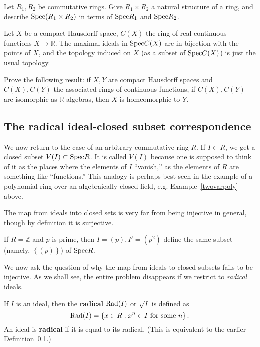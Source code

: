 \begin{exercise} 
Let $R_1, R_2$ be commutative rings. Give $R_1 \times R_2$ a natural structure
of a ring, and describe $\mathrm{Spec}( R_1 \times R_2)$ in terms of $\mathrm{Spec} R_1$ and
$\mathrm{Spec} R_2$.
\end{exercise} 


\begin{exercise} 
Let $X$ be a compact Hausdorff space, $C(X)$ the ring of real continuous
functions $X \to \mathbb{R}$. 
The maximal ideals in $\mathrm{Spec} C(X)$ are in bijection with the points of $X$,
and the topology induced on $X $ (as a subset of $\mathrm{Spec} C(X)$) is just the usual topology.
\end{exercise}

\begin{exercise}
Prove the following result: if $X, Y$ are compact Hausdorff spaces and $C(X),
C(Y)$ the associated rings of continuous functions, if $C(X), C(Y)$ are
isomorphic as $\mathbb{R}$-algebras, then $X$ is homeomorphic to $Y$.
\end{exercise} 


\subsection{The radical ideal-closed subset correspondence}

We now return to the case of an arbitrary  commutative ring $R$. If $I \subset R$, we get a closed
subset $V(I) \subset \mathrm{Spec} R$.  It is called $V(I)$ because one is supposed to
think of it as the places where the elements of $I$ ``vanish,'' as the
elements of $R$ are something like ``functions.'' This analogy is perhaps best
seen in the example of a polynomial ring over an algebraically closed field,
e.g. Example~\ref{twovarpoly} above.

The map from ideals into closed sets is very far from being injective in
general, though by definition it is surjective.

\begin{example} 
If $R = \mathbb{Z}$ and $p$ is prime, then $I = (p), I' = (p^2)$ define the
same subset (namely, $\left\{(p)\right\}$) of
$\mathrm{Spec} R$. 
\end{example} 

We now ask the question of why the map from ideals to closed subsets fails to
be injective. As we shall see, the entire problem disappears if we restrict to
\emph{radical} ideals.

\begin{definition} 
If $I$ is an ideal, then the \textbf{radical} $\mathrm{Rad}(I)  $ or $ \sqrt{I}$ is
defined as $$\mathrm{Rad}(I) =
\left\{x \in R: x^n \in I \ \mathrm{for} \ \mathrm{some} \ n \right\}.$$
An ideal is \textbf{radical} if it is equal to its radical. (This is
equivalent to the earlier Definition~\ref{}.) 
\end{definition} 

